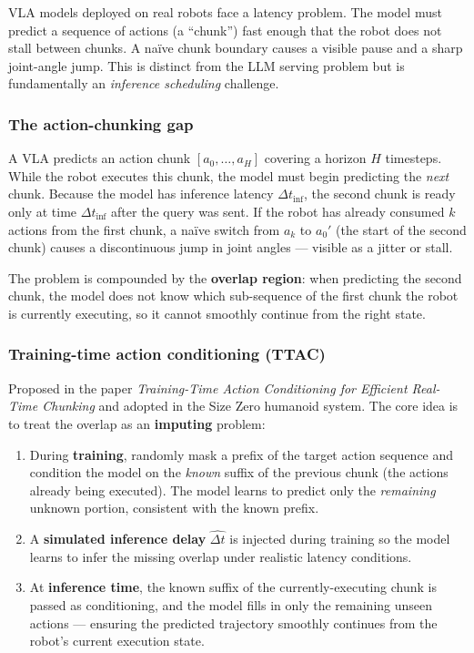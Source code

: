 \begin{intuitionbox}
VLA models deployed on real robots face a latency problem. The model must predict a sequence of actions (a ``chunk'') fast enough that the robot does not stall between chunks. A naïve chunk boundary causes a visible pause and a sharp joint-angle jump. This is distinct from the LLM serving problem but is fundamentally an \emph{inference scheduling} challenge.
\end{intuitionbox}

\subsubsection{The action-chunking gap}

A VLA predicts an action chunk $[a_0, \ldots, a_H]$ covering a horizon $H$ timesteps. While the robot executes this chunk, the model must begin predicting the \emph{next} chunk. Because the model has inference latency $\Delta t_\text{inf}$, the second chunk is ready only at time $\Delta t_\text{inf}$ after the query was sent. If the robot has already consumed $k$ actions from the first chunk, a naïve switch from $a_k$ to $a_0'$ (the start of the second chunk) causes a discontinuous jump in joint angles — visible as a jitter or stall.

The problem is compounded by the \textbf{overlap region}: when predicting the second chunk, the model does not know which sub-sequence of the first chunk the robot is currently executing, so it cannot smoothly continue from the right state.

\subsubsection{Training-time action conditioning (TTAC)}

Proposed in the paper \emph{Training-Time Action Conditioning for Efficient Real-Time Chunking} and adopted in the Size Zero humanoid system. The core idea is to treat the overlap as an \textbf{imputing} problem:

\begin{enumerate}
  \item During \textbf{training}, randomly mask a prefix of the target action sequence and condition the model on the \emph{known} suffix of the previous chunk (the actions already being executed). The model learns to predict only the \emph{remaining} unknown portion, consistent with the known prefix.
  \item A \textbf{simulated inference delay} $\hat{\Delta t}$ is injected during training so the model learns to infer the missing overlap under realistic latency conditions.
  \item At \textbf{inference time}, the known suffix of the currently-executing chunk is passed as conditioning, and the model fills in only the remaining unseen actions — ensuring the predicted trajectory smoothly continues from the robot's current execution state.
\end{enumerate}

